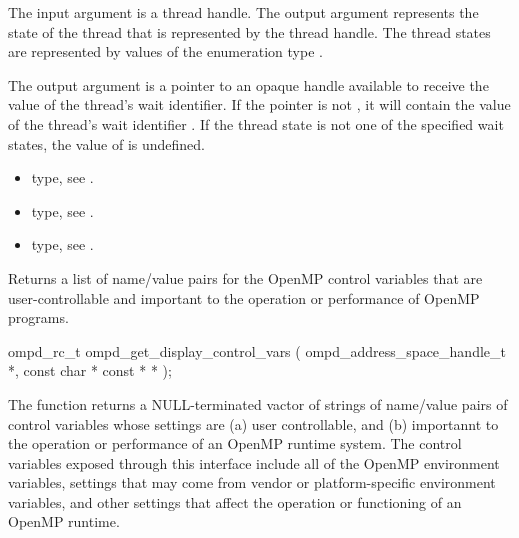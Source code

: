 The input argument  is a thread handle. The output argument
 represents the state of the thread that is represented by the thread handle.
The thread states are represented by values of the enumeration type
.

The output argument  is a pointer to an opaque handle available to receive the value 
of the thread's wait identifier. If the  pointer is not , it will contain
the value of the thread's wait identifier . If the thread state is not one of the 
specified wait states, the value of  is undefined.


\crossreferences
\begin{itemize}
	\item {} type, see .
	\item {} type, see .
	\item {} type, see .
\end{itemize}




\label{ompd:ompd_get_display_control_vars}
\label{sec:ompd_get_display_control_vars}
\summary
Returns a list of name/value pairs for the OpenMP control variables
that are user-controllable and important to the operation or
performance of OpenMP programs.
\format
\cspecificstart
\begin{ompSyntax}
ompd_rc_t ompd_get_display_control_vars (
  ompd_address_space_handle_t *,
  const char * const * *
);
\end{ompSyntax}
\cspecificend

\descr
The function  returns a
NULL-terminated vactor of strings of name/value pairs of control
variables whose settings are (a) user controllable,
and (b) importannt to the operation or performance of an OpenMP
runtime system.
The control variables exposed through this interface include all
of the OpenMP environment variables, settings that may come from
vendor or platform-specific environment variables, and other
settings that affect the operation or functioning of an OpenMP
runtime.

